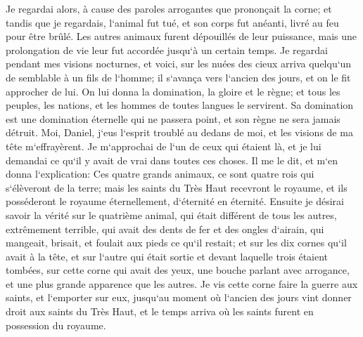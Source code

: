 \verse Je regardai alors, à cause des paroles arrogantes que prononçait la corne; et tandis que je regardais, l`animal fut tué, et son corps fut anéanti, livré au feu pour être brûlé. 
\verse Les autres animaux furent dépouillés de leur puissance, mais une prolongation de vie leur fut accordée jusqu`à un certain temps. 
\verse Je regardai pendant mes visions nocturnes, et voici, sur les nuées des cieux arriva quelqu`un de semblable à un fils de l`homme; il s`avança vers l`ancien des jours, et on le fit approcher de lui. 
\verse On lui donna la domination, la gloire et le règne; et tous les peuples, les nations, et les hommes de toutes langues le servirent. Sa domination est une domination éternelle qui ne passera point, et son règne ne sera jamais détruit. 
\verse Moi, Daniel, j`eus l`esprit troublé au dedans de moi, et les visions de ma tête m`effrayèrent. 
\verse Je m`approchai de l`un de ceux qui étaient là, et je lui demandai ce qu`il y avait de vrai dans toutes ces choses. Il me le dit, et m`en donna l`explication: 
\verse Ces quatre grands animaux, ce sont quatre rois qui s`élèveront de la terre; 
\verse mais les saints du Très Haut recevront le royaume, et ils posséderont le royaume éternellement, d`éternité en éternité. 
\verse Ensuite je désirai savoir la vérité sur le quatrième animal, qui était différent de tous les autres, extrêmement terrible, qui avait des dents de fer et des ongles d`airain, qui mangeait, brisait, et foulait aux pieds ce qu`il restait; 
\verse et sur les dix cornes qu`il avait à la tête, et sur l`autre qui était sortie et devant laquelle trois étaient tombées, sur cette corne qui avait des yeux, une bouche parlant avec arrogance, et une plus grande apparence que les autres. 
\verse Je vis cette corne faire la guerre aux saints, et l`emporter sur eux, 
\verse jusqu`au moment où l`ancien des jours vint donner droit aux saints du Très Haut, et le temps arriva où les saints furent en possession du royaume. 
